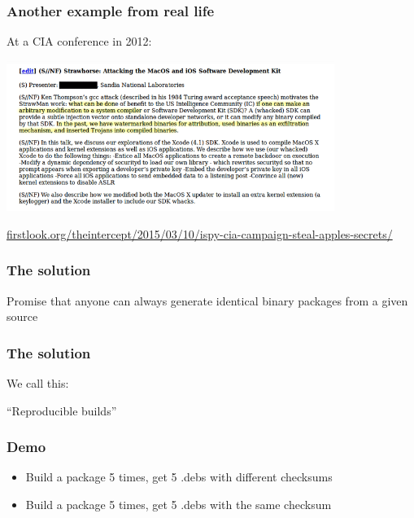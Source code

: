 \documentclass[14pt,aspectratio=169]{beamer}
\begin{document}
\begin{frame}[fragile]
 \frametitle{Another example from real life}

 At a CIA conference in 2012:
 \begin{center}
  \includegraphics[width=0.8\textwidth]{images/strawhorse.png}

  {\footnotesize
  \url{firstlook.org/theintercept/2015/03/10/ispy-cia-campaign-steal-apples-secrets/}
  }
 \end{center}
\end{frame}


\begin{frame}
 \frametitle{The solution}

 \begin{center}
 \Large{
 Promise that anyone can always generate
 identical binary packages
 from a given source}
\end{center}
\end{frame}


\begin{frame}
 \frametitle{The solution}

 \begin{center}
 We call this:

 \Huge{ “Reproducible builds” }
 \end{center}
\end{frame}

\begin{frame}
 \frametitle{Demo}
 \begin{itemize}
 \item<2-3> Build a package 5 times, get 5 .debs with different checksums
 \item<3> Build a package 5 times, get 5 .debs with the same checksum
 \end{itemize}
%
%
\end{frame}
\end{document}
